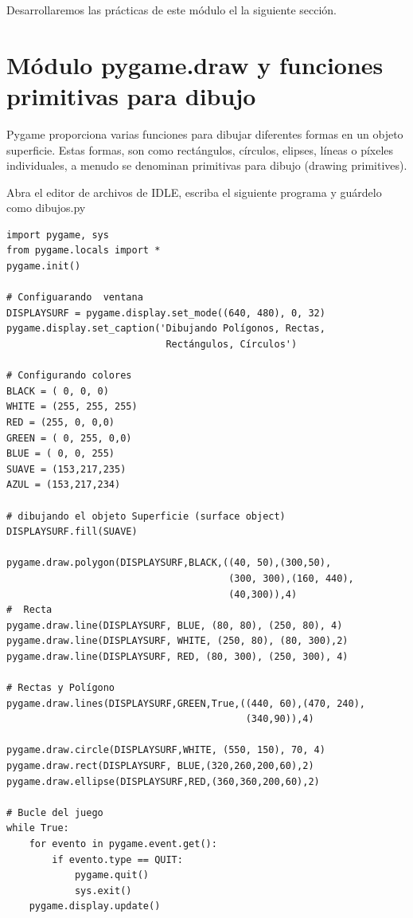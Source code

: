 Desarrollaremos las prácticas de este módulo el la siguiente sección.

\section{Módulo pygame.draw y  funciones primitivas para dibujo}

Pygame proporciona varias funciones para dibujar diferentes formas en un objeto superficie.
Estas formas, son como rectángulos, círculos, elipses, líneas o píxeles individuales, a menudo se denominan
primitivas para dibujo (drawing primitives). 


Abra el editor de archivos de IDLE, escriba el siguiente programa y guárdelo como {\ttfamily dibujos.py}

\hspace{-2.5cm}{\ttfamily \scriptsize dibujos.py}  \vspace{-0.5cm}
\begin{lstlisting}
import pygame, sys
from pygame.locals import *
pygame.init()

# Configuarando  ventana
DISPLAYSURF = pygame.display.set_mode((640, 480), 0, 32)
pygame.display.set_caption('Dibujando Polígonos, Rectas, 
                            Rectángulos, Círculos')

# Configurando colores
BLACK = ( 0, 0, 0)
WHITE = (255, 255, 255)
RED = (255, 0, 0,0)
GREEN = ( 0, 255, 0,0)
BLUE = ( 0, 0, 255)
SUAVE = (153,217,235)
AZUL = (153,217,234)

# dibujando el objeto Superficie (surface object)
DISPLAYSURF.fill(SUAVE)

pygame.draw.polygon(DISPLAYSURF,BLACK,((40, 50),(300,50),
                                       (300, 300),(160, 440),
                                       (40,300)),4)
#  Recta
pygame.draw.line(DISPLAYSURF, BLUE, (80, 80), (250, 80), 4)
pygame.draw.line(DISPLAYSURF, WHITE, (250, 80), (80, 300),2)
pygame.draw.line(DISPLAYSURF, RED, (80, 300), (250, 300), 4)

# Rectas y Polígono
pygame.draw.lines(DISPLAYSURF,GREEN,True,((440, 60),(470, 240),
                                          (340,90)),4)

pygame.draw.circle(DISPLAYSURF,WHITE, (550, 150), 70, 4)
pygame.draw.rect(DISPLAYSURF, BLUE,(320,260,200,60),2)
pygame.draw.ellipse(DISPLAYSURF,RED,(360,360,200,60),2)

# Bucle del juego
while True:
    for evento in pygame.event.get():
        if evento.type == QUIT:
            pygame.quit()
            sys.exit()
    pygame.display.update()	
\end{lstlisting}	


